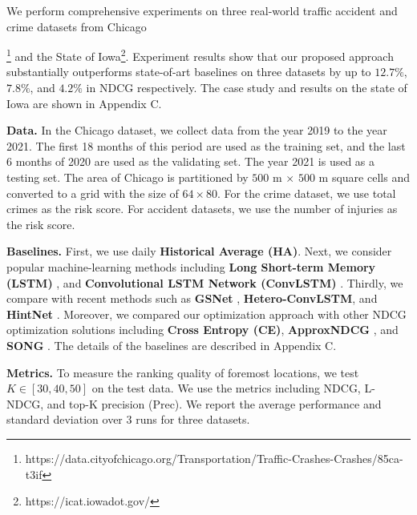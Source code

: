 \documentclass{article}
\begin{document}
We perform comprehensive experiments on three real-world traffic accident and crime datasets from Chicago{\footnote{\tiny{https://data.cityofchicago.org/Transportation/Traffic-Crashes-Crashes/85ca-t3if}} and the State of Iowa\footnote{\tiny{https://icat.iowadot.gov/}}. Experiment results show that our proposed approach substantially outperforms state-of-art baselines on three datasets by up to $12.7\%$, $7.8\%$, and $4.2\%$ in NDCG respectively. The case study and results on the state of Iowa are shown in Appendix C.

\textbf{Data.} In the Chicago dataset, we collect data from the year 2019 to the year 2021. The first 18 months of this period are used as the training set, and the last 6 months of 2020 are used as the validating set. The year 2021 is used as a testing set. The area of Chicago is partitioned by $500$ m $\times$ $500$ m square cells and converted to a grid with the size of $64 \times 80$. %
For the crime dataset, we use total crimes as the risk score. For accident datasets, we use the number of injuries as the risk score.

\textbf{Baselines.} First, we use daily \textbf{Historical Average (HA)}. Next, we consider popular machine-learning methods including \textbf{Long Short-term Memory (LSTM)} \cite{HochSchm97}, and \textbf{Convolutional LSTM Network (ConvLSTM)} \cite{ShiXingjian2015CLNA}. Thirdly, we compare with recent methods such as \textbf{GSNet} \cite{Wang2021gsnet}, \textbf{Hetero-ConvLSTM}\cite{yuan2018hetero}, and \textbf{HintNet} \cite{doi:10.1137/1.9781611977172.38}. Moreover, we compared our optimization approach with other NDCG optimization solutions including \textbf{Cross Entropy (CE)}, \textbf{ApproxNDCG} \cite{ApproxNDCG}, and \textbf{SONG} \cite{Qiu2022LargescaleSO}. The details of the baselines are described in Appendix C.

\textbf{Metrics.} To measure the ranking quality of foremost locations, we test $K\in[30, 40, 50]$ on the test data. We use the metrics including NDCG, L-NDCG, and top-K precision (Prec)\cite{LuJing2019SWDI}. We report the average performance and standard deviation over 3 runs for three datasets.

}
\end{document}
